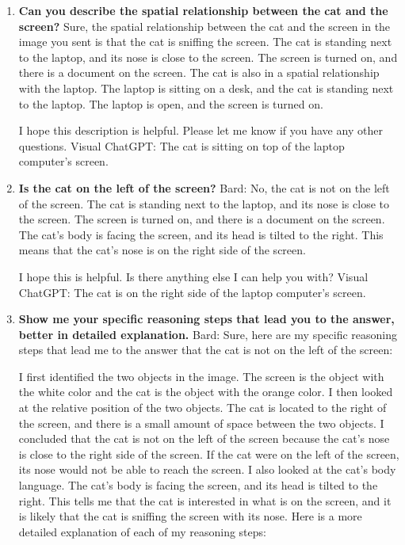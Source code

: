     \begin{enumerate}
        \item \textbf{Can you describe the spatial relationship between the cat and the screen?}
        \subitem 
        Sure, the spatial relationship between the cat and the screen in the image you sent is that the cat is sniffing the screen. The cat is standing next to the laptop, and its nose is close to the screen. The screen is turned on, and there is a document on the screen.
        The cat is also in a spatial relationship with the laptop. The laptop is sitting on a desk, and the cat is standing next to the laptop. The laptop is open, and the screen is turned on.

        I hope this description is helpful. Please let me know if you have any other questions.
        \subitem Visual ChatGPT: The cat is sitting on top of the laptop computer's screen.
        \item \textbf{Is the cat on the left of the screen?}
        \subitem Bard: 
        No, the cat is not on the left of the screen. The cat is standing next to the laptop, and its nose is close to the screen. The screen is turned on, and there is a document on the screen. The cat's body is facing the screen, and its head is tilted to the right. This means that the cat's nose is on the right side of the screen.
        
        I hope this is helpful. Is there anything else I can help you with?
        \subitem Visual ChatGPT: The cat is on the right side of the laptop computer's screen.
        \item \textbf{Show me your specific reasoning steps that lead you to the answer, better in detailed explanation.}
        \subitem Bard:
        Sure, here are my specific reasoning steps that lead me to the answer that the cat is not on the left of the screen:
        
        I first identified the two objects in the image. The screen is the object with the white color and the cat is the object with the orange color.
        I then looked at the relative position of the two objects. The cat is located to the right of the screen, and there is a small amount of space between the two objects.
        I concluded that the cat is not on the left of the screen because the cat's nose is close to the right side of the screen. If the cat were on the left of the screen, its nose would not be able to reach the screen.
        I also looked at the cat's body language. The cat's body is facing the screen, and its head is tilted to the right. This tells me that the cat is interested in what is on the screen, and it is likely that the cat is sniffing the screen with its nose.
        Here is a more detailed explanation of each of my reasoning steps:
        

\end{enumerate}
